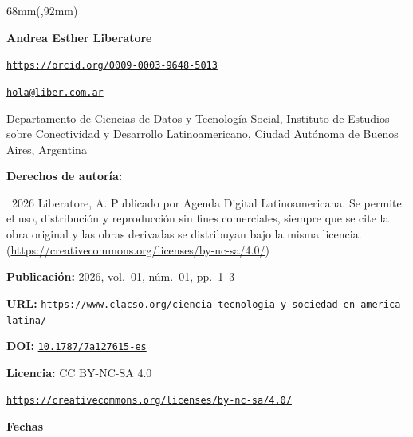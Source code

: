 \documentclass{article}
\newlength{\gbbloquex}
\begin{document}
\begin{textblock*}{68mm}(\gbbloquex,92mm)
{\setlength{\leftskip}{0pt}\setlength{\parindent}{0pt}%
\noindent\begin{minipage}[t]{68mm}
\sffamily\small\setlength{\parskip}{1pt}
{\bfseries\color{azulrevista}Andrea Esther Liberatore}\par
{\scriptsize\texttt{\href{https://orcid.org/0009-0003-9648-5013}{https://orcid.org/0009-0003-9648-5013}}}\par
{\scriptsize\texttt{\href{mailto:hola@liber.com.ar}{hola@liber.com.ar}}}\par
Departamento de Ciencias de Datos y Tecnología Social, Instituto de Estudios sobre Conectividad y Desarrollo Latinoamericano, Ciudad Autónoma de Buenos Aires, Argentina\par
\vspace{6pt}
{\bfseries\color{azulrevista!70}Derechos de autor\'ia:}\par
\textcopyright\ 2026 Liberatore, A. Publicado por Agenda Digital Latinoamericana. Se permite el uso, distribución y reproducción sin fines comerciales, siempre que se cite la obra original y las obras derivadas se distribuyan bajo la misma licencia. (\href{https://creativecommons.org/licenses/by-nc-sa/4.0/}{https://creativecommons.org/licenses/by-nc-sa/4.0/})\par\vspace{6pt}
{\bfseries\color{azulrevista!70}Publicación:} 2026, vol.~01, n\'um.~01, pp.~1--3\par\vspace{6pt}
{\bfseries\color{azulrevista!70}URL:} {\scriptsize\texttt{\href{https://www.clacso.org/ciencia-tecnologia-y-sociedad-en-america-latina/}{https://www.clacso.org/ciencia-tecnologia-y-sociedad-en-america-latina/}}}\par\vspace{6pt}
{\bfseries\color{azulrevista!70}DOI:} {\scriptsize\texttt{\href{https://doi.org/10.1787/7a127615-es}{10.1787/7a127615-es}}}\par\vspace{6pt}
{\bfseries\color{azulrevista!70}Licencia:} CC BY-NC-SA 4.0\par
{\scriptsize\texttt{\href{https://creativecommons.org/licenses/by-nc-sa/4.0/}{https://creativecommons.org/licenses/by-nc-sa/4.0/}}}\par
\vspace{6pt}
{\bfseries\color{azulrevista!70}Fechas}\par\vspace{2pt}

\end{minipage}}
\end{textblock*}
\end{document}
